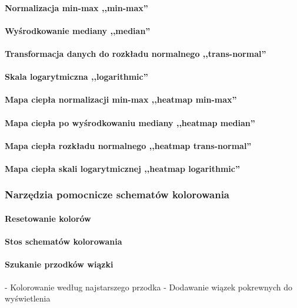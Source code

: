 \paragraph{Normalizacja min-max ,,min-max''}
\paragraph{Wyśrodkowanie mediany ,,median''}
\paragraph{Transformacja danych do rozkładu normalnego ,,trans-normal''}
\paragraph{Skala logarytmiczna ,,logarithmic''}
\paragraph{Mapa ciepła normalizacji min-max ,,heatmap min-max''}
\paragraph{Mapa ciepła po wyśrodkowaniu mediany ,,heatmap median''}
\paragraph{Mapa ciepła rozkładu normalnego ,,heatmap trans-normal''}
\paragraph{Mapa ciepła skali logarytmicznej ,,heatmap logarithmic''}
\subsubsection{Narzędzia pomocnicze schematów kolorowania}
\paragraph{Resetowanie kolorów}
\paragraph{Stos schematów kolorowania}
\paragraph{Szukanie przodków wiązki}
- Kolorowanie według najstarszego przodka
- Dodawanie wiązek pokrewnych do wyświetlenia 
